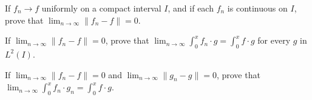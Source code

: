 \begin{problembox}
If $f_n \to f$ uniformly on a compact interval $I$, and if each $f_n$ is continuous on $I$, prove that $\lim_{n \to \infty} \| f_n - f \| = 0$.
\end{problembox}

\begin{problembox}
If $\lim_{n \to \infty} \| f_n - f \| = 0$, prove that $\lim_{n \to \infty} \int_0^x f_n \cdot g = \int_0^x f \cdot g$ for every $g$ in $L^2(I)$.
\end{problembox}

\begin{problembox}
If $\lim_{n \to \infty} \| f_n - f \| = 0$ and $\lim_{n \to \infty} \| g_n - g \| = 0$, prove that $\lim_{n \to \infty} \int_0^x f_n \cdot g_n = \int_0^x f \cdot g$.
\end{problembox}